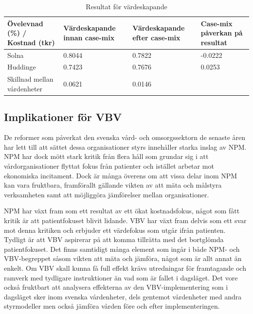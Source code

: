 \begin{table}[h]
\centering
\caption{Resultat för värdeskapande}
\label{tab:varderes}
\begin{tabular}{|p{4cm}|p{3cm}|p{2.5cm}|p{3.5cm}|}
\hline
Övelevnad (\%) / Kostnad (tkr)           & Värdeskapande innan case-mix & Värdeskapande efter case-mix & Case-mix påverkan på resultat \\ \hline
Solna                       & 0.8044                       & 0.7822                       & -0.0222                       \\ \hline
Huddinge                    & 0.7423                       & 0.7676                       & 0.0253                        \\ \hline
Skillnad mellan \linebreak vårdenheter & 0.0621                       & 0.0146                       &                               \\ \hline
\end{tabular}
\end{table}

\subsection{Implikationer för VBV}

De reformer som påverkat den svenska vård- och omsorgssektorn de senaste åren har lett till att sättet dessa organisationer styrs innehåller starka inslag av NPM. NPM har dock mött stark kritik från flera håll som grundar sig i att vårdorganisationer flyttat fokus från patienter och istället arbetar mot ekonomiska incitament. Dock är många överens om att vissa delar inom NPM kan vara fruktbara, framförallt gällande vikten av att mäta och målstyra verksamheten samt att möjliggöra jämförelser mellan organisationer.

NPM har växt fram som ett resultat av ett ökat kostnadsfokus, något som fått kritik är att patientfokuset blivit lidande. VBV har växt fram delvis som ett svar mot denna kritiken och erbjuder ett värdefokus som utgår ifrån patienten. Tydligt är att VBV aspirerar på att komma tillrätta med det bortglömda patientfokuset. Det finns samtidigt många element som ingår i både NPM- och VBV-begreppet såsom vikten att mäta och jämföra, något som är allt annat än enkelt. Om VBV skall kunna få full effekt krävs utredningar för framtagande och ramverk med tydligare instruktioner än vad som är fallet i dagsläget. Det vore också fruktbart att analysera effekterna av den VBV-implementering som i dagsläget sker inom svenska vårdenheter, dels gentemot vårdenheter med andra styrmodeller men också jämföra vården före och efter implementeringen.

